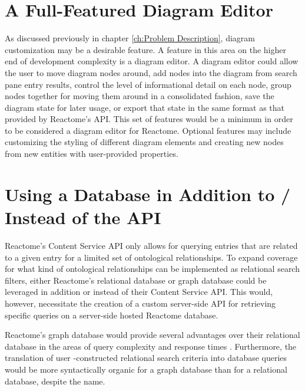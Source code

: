 \documentclass[12pt, letterpaper]{report}
\begin{document}
\section {A Full-Featured Diagram Editor}
As discussed previously in chapter \ref{ch:Problem Description}, diagram customization may be a desirable feature. A feature in this area on the higher end of development complexity is a diagram editor. A diagram editor could allow the user to move diagram nodes around, add nodes into the diagram from search pane entry results, control the level of informational detail on each node, group nodes together for moving them around in a consolidated fashion, save the diagram state for later usage, or export that state in the same format as that provided by Reactome's API. This set of features would be a minimum in order to be considered a diagram editor for Reactome. Optional features may include customizing the styling of different diagram elements and creating new nodes from new entities with user-provided properties.

\section {Using a Database in Addition to / Instead of the API}
Reactome's Content Service API only allows for querying entries that are related to a given entry for a limited set of ontological relationships. To expand coverage for what kind of ontological relationships can be implemented as relational search filters, either Reactome's relational database or graph database could be leveraged in addition or instead of their Content Service API. This would, however, necessitate the creation of a custom server-side API for retrieving specific queries on a server-side hosted Reactome database.

Reactome's graph database would provide several advantages over their relational database in the areas of query complexity and response times \cite{FabregatAntonio2018RgdE}. Furthermore, the translation of user -constructed relational search criteria into database queries would be more syntactically organic for a graph database than for a relational database, despite the name.



\end{document}
